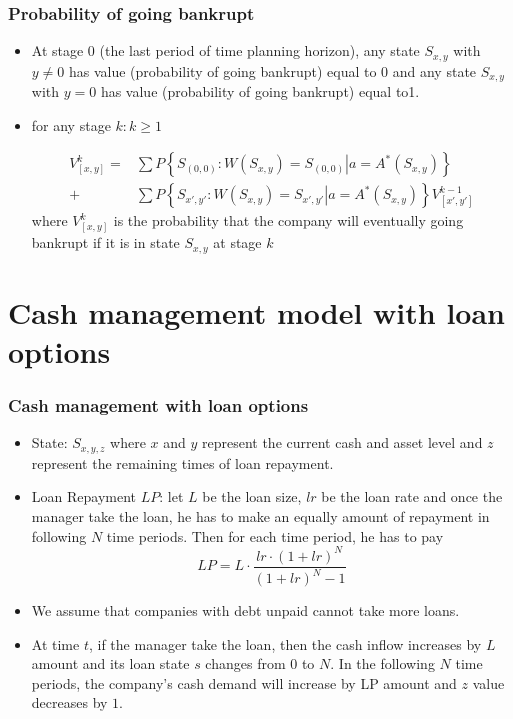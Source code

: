 \documentclass{beamer}
\begin{document}
\begin{frame}
\frametitle{Probability of going bankrupt}
\begin{itemize}
\item At stage 0 (the last period of time planning horizon), any state $S_{x, y}$ with $y \neq 0$ has value (probability of going bankrupt) equal to 0 and any state $S_{x, y}$ with $y = 0$ has value (probability of going bankrupt) equal to1.
\item for any stage $k: k \geq 1$

\[
\begin{split}
V_{[x,y]}^{k} =& \sum P\left\{\left.S_{(0,0)}:W(S_{x,y}) = S_{(0,0)}\right|a = A^*(S_{x,y})\right\} 
\\ 
+ & \sum P\left\{ \left. S_{x',y'}:W(S_{x,y}) = S_{x',y'} \right| a = A^* (S_{x,y})\right\}  V_{[x',y']}^{k-1}
\end{split}
\]
where $V_{[x,y]}^{k} $ is the probability that the company will eventually going bankrupt if it is in state $S_{x,y}$ at stage $k$
\end{itemize}
\end{frame}

\section{Cash management model with loan options}
\begin{frame}
\frametitle{Cash management with loan options}
\begin{itemize}
\item State: $S_{x,y,z}$ where $x$ and $y$ represent the current cash and asset level and $z$ represent the remaining times of loan repayment.
\item Loan Repayment $LP$: let $L$ be the loan size, $lr$ be the loan rate and once the manager take the loan, he has to make an equally amount of repayment in following $N$ time periods. Then for each time period, he has to pay $$LP = L \cdot \frac{lr \cdot (1+lr)^N}{(1+lr)^N-1}$$
\item We assume that companies with debt unpaid cannot take more loans.
\item At time $t$, if the manager take the loan, then the cash inflow increases by $L$ amount and its loan state $s$ changes from $0$ to $N$. In the following $N$ time periods, the company's cash demand will increase by LP amount and $z$ value decreases by $1$. 
\end{itemize}
\end{frame}
\end{document}
